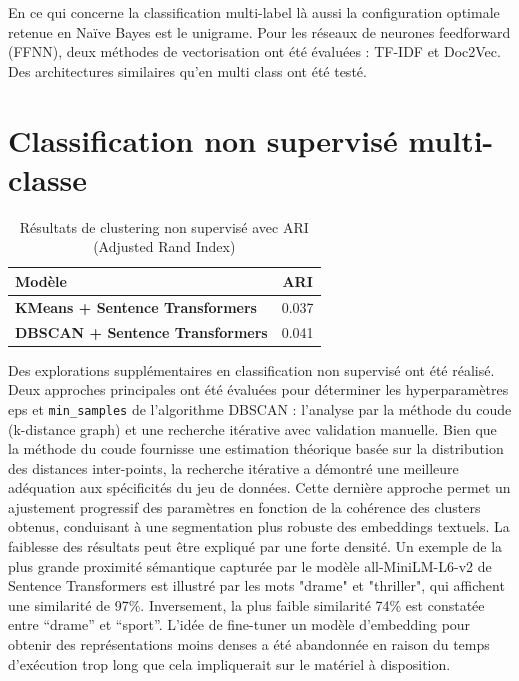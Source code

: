 \documentclass[12pt]{report}
\begin{document}
En ce qui concerne la classification multi-label là aussi la configuration optimale retenue en Naïve Bayes est le unigrame. Pour les réseaux de neurones feedforward (FFNN), deux méthodes de vectorisation ont été évaluées : TF-IDF et Doc2Vec. Des architectures similaires qu’en multi class ont été testé. 

\section{Classification non supervisé multi-classe}

\begin{table}[H]
\centering
\begin{tabular}{|l|c|}
\hline
\textbf{Modèle} & \textbf{ARI} \\
\hline
\textbf{KMeans + Sentence Transformers}  & 0.037 \\
\textbf{DBSCAN + Sentence Transformers}  & 0.041 \\
\hline
\end{tabular}
\caption{Résultats de clustering non supervisé avec ARI (Adjusted Rand Index)}
\label{tab:clustering_ari}
\end{table}

Des explorations supplémentaires en classification non supervisé ont été réalisé. Deux approches principales ont été évaluées pour déterminer les hyperparamètres eps et \texttt{min\_samples} de l'algorithme DBSCAN : l'analyse par la méthode du coude (k-distance graph) et une recherche itérative avec validation manuelle. Bien que la méthode du coude fournisse une estimation théorique basée sur la distribution des distances inter-points, la recherche itérative a démontré une meilleure adéquation aux spécificités du jeu de données. Cette dernière approche permet un ajustement progressif des paramètres en fonction de la cohérence des clusters obtenus, conduisant à une segmentation plus robuste des embeddings textuels. La faiblesse des résultats peut être expliqué par une forte densité. Un exemple de la plus grande proximité sémantique capturée par le modèle all-MiniLM-L6-v2 de Sentence Transformers est illustré par les mots "drame" et "thriller", qui affichent une similarité de 97\%. Inversement, la plus faible similarité 74\% est constatée entre “drame” et “sport”. L'idée de fine-tuner un modèle d'embedding pour obtenir des représentations moins denses a été abandonnée en raison du temps d'exécution trop long que cela impliquerait sur le matériel à disposition. 


\vspace{1.5\baselineskip}
\end{document}
